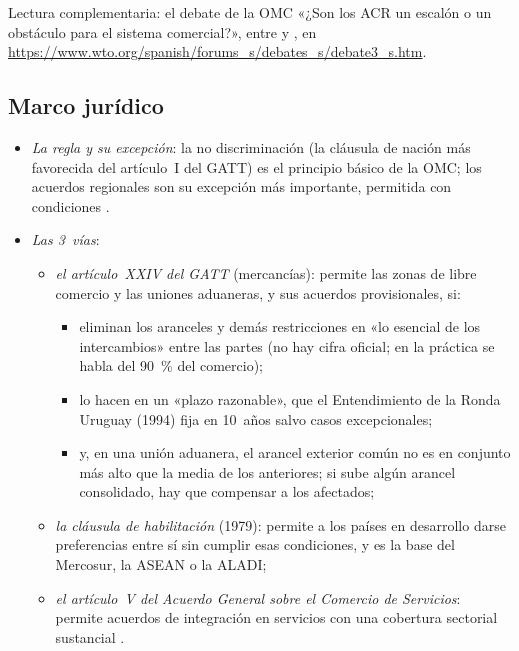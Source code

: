 \documentclass[11pt]{article}
\begin{document}
\begin{anotaciones}
Lectura complementaria: el debate de la OMC «¿Son los ACR un escalón o un obstáculo para el sistema comercial?», entre  y \nocite{OMCDebateACR}, en \url{https://www.wto.org/spanish/forums_s/debates_s/debate3_s.htm}.
\end{anotaciones}

\subsection{Marco jurídico}\label{sec:marco}

\begin{itemize}
\item \emph{La regla y su excepción}: la no discriminación (la cláusula de nación más favorecida del artículo~I del GATT) es el principio básico de la OMC; los acuerdos regionales son su excepción más importante, permitida con condiciones .
\item \emph{Las 3~vías}:
  \begin{itemize}
  \item \emph{el artículo~XXIV del GATT} (mercancías): permite las zonas de libre comercio y las uniones aduaneras, y sus acuerdos provisionales, si\nocite{GATT1947,OMC1994EntendimientoXXIV}:
    \begin{itemize}
    \item eliminan los aranceles y demás restricciones en «lo esencial de los intercambios» entre las partes (no hay cifra oficial; en la práctica se habla del 90~\% del comercio);
    \item lo hacen en un «plazo razonable», que el Entendimiento de la Ronda Uruguay (1994) fija en 10~años salvo casos excepcionales;
    \item y, en una unión aduanera, el arancel exterior común no es en conjunto más alto que la media de los anteriores; si sube algún arancel consolidado, hay que compensar a los afectados;
    \end{itemize}
  \item \emph{la cláusula de habilitación} (1979): permite a los países en desarrollo darse preferencias entre sí sin cumplir esas condiciones, y es la base del Mercosur, la ASEAN o la ALADI\nocite{GATT1979Habilitacion};
  \item \emph{el artículo~V del Acuerdo General sobre el Comercio de Servicios}: permite acuerdos de integración en servicios con una cobertura sectorial sustancial .

\end{itemize}
\end{itemize}
\end{document}
